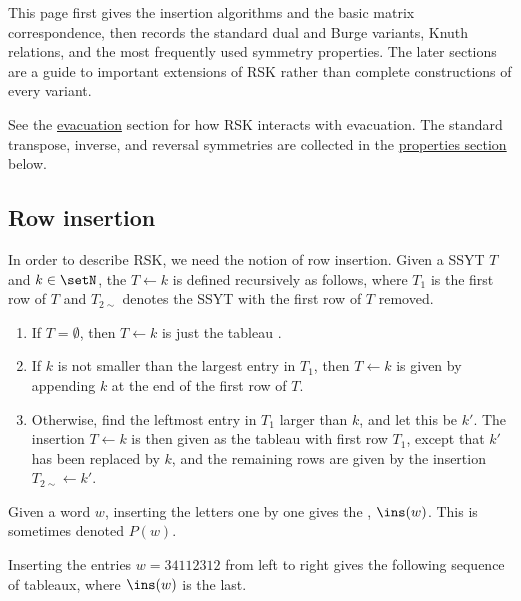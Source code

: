 This page first gives the insertion algorithms and the basic matrix
correspondence, then records the standard dual and Burge variants, Knuth
relations, and the most frequently used symmetry properties.  The later
sections are a guide to important extensions of RSK rather than complete
constructions of every variant.

See the \hyperref[evacuation]{evacuation} section for how RSK interacts with
evacuation.
The standard transpose, inverse, and reversal symmetries are collected in the
\hyperref[rskProperties]{properties section} below.

\subsection[rowInsertion]{Row insertion}

In order to describe RSK, we need the notion of row insertion.
Given a SSYT $T$ and $k \in \setN$, the 
$T \leftarrow k$ is defined recursively as follows,
where $T_1$ is the first row of $T$ and $T_{2\sim}$ denotes the SSYT with the first row of $T$
removed.
\begin{enumerate}
\item If $T = \emptyset$, then $T \leftarrow k$ is just the tableau .
\item If $k$ is not smaller than the largest entry in $T_1$,
then $T  \leftarrow k$ is given by appending $k$ at the end of the first row of $T$.
\item Otherwise, find the leftmost entry in $T_1$ larger than $k$, and let this be $k'$.
The insertion $T \leftarrow k$ is then given as the tableau with first row $T_1$,
except that $k'$ has been replaced by $k$, and the remaining rows are given by
the insertion $T_{2\sim}  \leftarrow k'$.
\end{enumerate}
Given a word $w$, inserting the letters one by one gives the
\label{insertionTableau}, $\ins(w)$.
This is sometimes denoted $P(w)$.

\begin{example}
Inserting the entries $w = 34112312$ from left to right
gives the following sequence of tableaux, where $\ins(w)$ is the last.

\begin{figure}
\end{figure}

\end{example}


